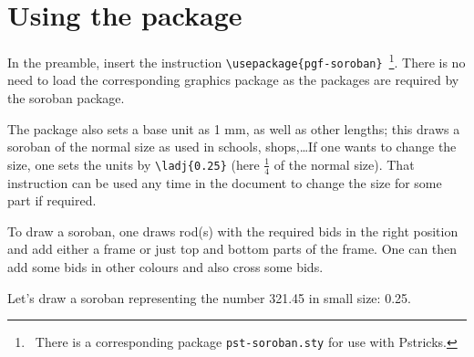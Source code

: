\documentclass[a4paper]{article}
\begin{document}
\section{Using the package}

In the preamble, insert the instruction \verb+\usepackage{pgf-soroban}+~\footnote{\ There is a corresponding package \texttt{pst-soroban.sty} for use with Pstricks.}. There is
no need to load the corresponding graphics package as the packages are required
by the soroban package.

The package also sets a base unit as 1 mm, as well as other lengths; this draws a soroban of the normal size as used in schools, shops,\dots If one wants to change the size, one sets the units by \verb+\ladj{0.25}+ (here $\frac 14$ of the normal size). That instruction can be used any time in the document to change the size for some part if required.

To draw a soroban, one draws rod(s) with the required bids in the right position and add either a frame or just top and bottom parts of the frame. One can then add some bids in other colours and also cross some bids.

Let's draw a soroban representing the number 321.45 in small size: 0.25.
\end{document}
